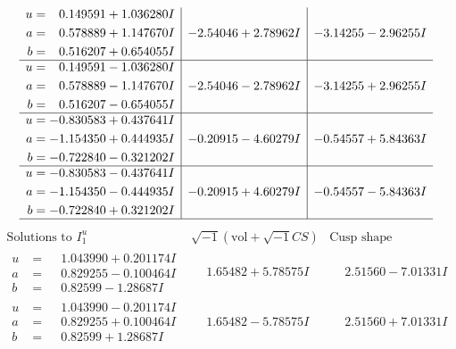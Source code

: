 \documentclass[1p]{elsarticle_modified}
\theoremstyle{definition}
\newcommand{\I}{\sqrt{-1}}
\begin{document}
$$\begin{array}{c|c|c}
\begin{aligned}
u &= \phantom{-}0.149591 + 1.036280 I \\
a &= \phantom{-}0.578889 + 1.147670 I \\
b &= \phantom{-}0.516207 + 0.654055 I\end{aligned}
 & -2.54046 + 2.78962 I & -3.14255 - 2.96255 I \\ \hline\begin{aligned}
u &= \phantom{-}0.149591 - 1.036280 I \\
a &= \phantom{-}0.578889 - 1.147670 I \\
b &= \phantom{-}0.516207 - 0.654055 I\end{aligned}
 & -2.54046 - 2.78962 I & -3.14255 + 2.96255 I \\ \hline\begin{aligned}
u &= -0.830583 + 0.437641 I \\
a &= -1.154350 + 0.444935 I \\
b &= -0.722840 - 0.321202 I\end{aligned}
 & -0.20915 - 4.60279 I & -0.54557 + 5.84363 I \\ \hline\begin{aligned}
u &= -0.830583 - 0.437641 I \\
a &= -1.154350 - 0.444935 I \\
b &= -0.722840 + 0.321202 I\end{aligned}
 & -0.20915 + 4.60279 I & -0.54557 - 5.84363 I\\
 \hline 
 \end{array}$$\newpage$$\begin{array}{c|c|c}  
\text{Solutions to }I^u_{1}& \I (\text{vol} + \sqrt{-1}CS) & \text{Cusp shape}\\
 \hline 
\begin{aligned}
u &= \phantom{-}1.043990 + 0.201174 I \\
a &= \phantom{-}0.829255 - 0.100464 I \\
b &= \phantom{-}0.82599 - 1.28687 I\end{aligned}
 & \phantom{-}1.65482 + 5.78575 I & \phantom{-}2.51560 - 7.01331 I \\ \hline\begin{aligned}
u &= \phantom{-}1.043990 - 0.201174 I \\
a &= \phantom{-}0.829255 + 0.100464 I \\
b &= \phantom{-}0.82599 + 1.28687 I\end{aligned}
 & \phantom{-}1.65482 - 5.78575 I & \phantom{-}2.51560 + 7.01331 I \\ \hline\begin{aligned}

\end{aligned}
\end{array}$$
\end{document}
